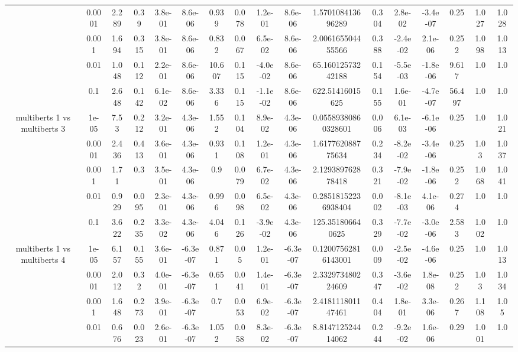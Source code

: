 \begin{tabular}{|c|c|c|c|c|c|c|c|c|c|c|c|c|c|c|c|c|}
 & 0.0001 & 2.289 & 0.39 & 3.8e-01 & 8.6e-06 & 0.939 & 0.078 & 1.2e-01 & 8.6e-06 & 1.570108413696289 & 0.304 & 2.8e-02 & -3.4e-07 & 0.25 & 1.027 & 1.028 \\
 & 0.001 & 1.694 & 0.315 & 3.8e-01 & 8.6e-06 & 0.832 & 0.067 & 6.5e-02 & 8.6e-06 & 2.006165504455566 & 0.388 & -2.4e-02 & 2.1e-06 & 0.252 & 1.098 & 1.013 \\
 & 0.01 & 1.048 & 0.112 & 2.2e-01 & 8.6e-06 & 10.607 & 0.115 & -4.0e-02 & 8.6e-06 & 65.16012573242188 & 0.154 & -5.5e-03 & -1.8e-06 & 9.617 & 1.0 & 1.0 \\
 & 0.1 & 2.648 & 0.142 & 6.1e-02 & 8.6e-06 & 3.336 & 0.115 & -1.1e-02 & 8.6e-06 & 622.51416015625 & 0.155 & 1.6e-01 & -4.7e-07 & 56.497 & 1.0 & 1.0 \\
\hline
\multirow{5}{*}{multiberts 1 vs multiberts 3} & 1e-05 & 7.53 & 0.212 & 3.2e-01 & 4.3e-06 & 1.552 & 0.104 & 8.9e-02 & 4.3e-06 & 0.05589380860328601 & 0.006 & 6.1e-03 & -6.1e-06 & 0.25 & 1.0 & 1.021 \\
 & 0.0001 & 2.436 & 0.413 & 3.6e-01 & 4.3e-06 & 0.931 & 0.108 & 1.2e-01 & 4.3e-06 & 1.617762088775634 & 0.234 & -8.2e-02 & -3.4e-06 & 0.25 & 1.03 & 1.037 \\
 & 0.001 & 1.71 & 0.3 & 3.5e-01 & 4.3e-06 & 0.9 & 0.079 & 6.7e-02 & 4.3e-06 & 2.129389762878418 & 0.321 & -7.9e-02 & -1.8e-06 & 0.252 & 1.068 & 1.041 \\
 & 0.01 & 0.929 & 0.095 & 2.3e-01 & 4.3e-06 & 0.996 & 0.098 & 6.5e-02 & 4.3e-06 & 0.28518152236938404 & 0.002 & -8.1e-03 & 4.1e-06 & 0.274 & 1.0 & 1.0 \\
 & 0.1 & 3.622 & 0.235 & 3.3e-02 & 4.3e-06 & 4.046 & 0.126 & -3.9e-02 & 4.3e-06 & 125.351806640625 & 0.329 & -7.7e-02 & -3.0e-06 & 2.583 & 1.002 & 1.0 \\
\hline
\multirow{5}{*}{multiberts 1 vs multiberts 4} & 1e-05 & 6.157 & 0.155 & 3.6e-01 & -6.3e-07 & 0.871 & 0.05 & 1.2e-01 & -6.3e-07 & 0.12007562816143001 & 0.009 & -2.5e-02 & -4.6e-06 & 0.25 & 1.0 & 1.013 \\
 & 0.0001 & 2.012 & 0.32 & 4.0e-01 & -6.3e-07 & 0.651 & 0.041 & 1.4e-01 & -6.3e-07 & 2.332973480224609 & 0.347 & -3.6e-02 & 1.8e-08 & 0.252 & 1.03 & 1.034 \\
 & 0.001 & 1.648 & 0.273 & 3.9e-01 & -6.3e-07 & 0.7 & 0.053 & 6.9e-02 & -6.3e-07 & 2.418111801147461 & 0.404 & 1.8e-01 & 3.3e-06 & 0.267 & 1.108 & 1.05 \\
 & 0.01 & 0.676 & 0.023 & 2.6e-01 & -6.3e-07 & 1.052 & 0.058 & 8.3e-02 & -6.3e-07 & 8.814712524414062 & 0.244 & -9.2e-02 & 1.6e-06 & 0.29 & 1.001 & 1.0 \\

\end{tabular}
